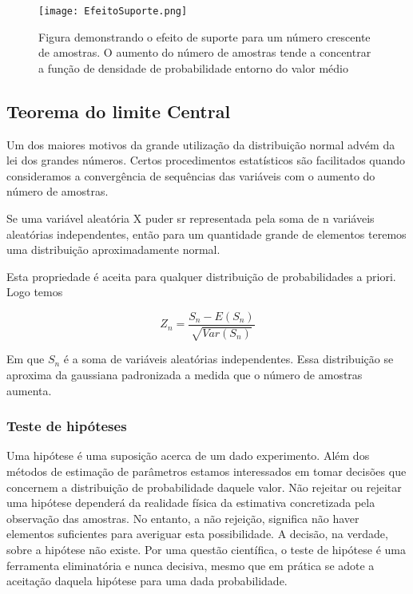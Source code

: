 \begin{figure}[H]
 	\centering
 	\texttt{[image: EfeitoSuporte.png]}	
 	\caption{Figura demonstrando o efeito de suporte para um número crescente de amostras. O aumento do número de amostras tende a concentrar a  função de densidade de probabilidade entorno do valor médio }
 	\label{Efeito_Suporte}
\end{figure}

\subsection{Teorema do limite Central}

Um dos maiores motivos da grande utilização da distribuição normal advém da lei dos grandes números. Certos procedimentos estatísticos são facilitados quando consideramos a convergência de sequências das variáveis com o aumento do número de amostras.  

Se uma variável aleatória X puder sr representada pela soma de n variáveis aleatórias independentes, então para um quantidade grande de elementos teremos uma distribuição aproximadamente normal.

Esta propriedade é aceita para qualquer distribuição de probabilidades a priori. Logo temos 

\begin{equation}
	Z_{n} = \frac{S_{n}-E(S_{n})}{\sqrt{Var(S_{n})}}
\end{equation}

Em que $S_{n}$ é a soma de variáveis aleatórias independentes. Essa distribuição se aproxima da gaussiana padronizada a medida que o número de amostras aumenta. 


\subsubsection{Teste de hipóteses}


Uma hipótese é uma suposição acerca de um dado experimento. Além dos métodos de estimação de parâmetros  estamos interessados em tomar decisões que concernem a distribuição de probabilidade daquele valor. Não rejeitar ou rejeitar uma hipótese dependerá da realidade física da estimativa concretizada pela observação das amostras. No entanto, a não rejeição, significa não haver elementos suficientes para averiguar esta possibilidade. A decisão, na verdade, sobre a hipótese não existe. Por uma questão científica, o teste de hipótese é uma ferramenta eliminatória e nunca decisiva, mesmo que em prática se adote a aceitação daquela hipótese para uma dada probabilidade.

